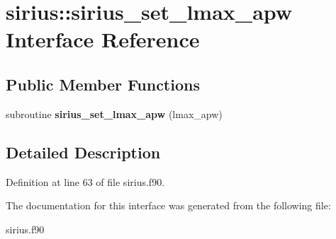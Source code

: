 \hypertarget{interfacesirius_1_1sirius__set__lmax__apw}{}\section{sirius\+:\+:sirius\+\_\+set\+\_\+lmax\+\_\+apw Interface Reference}
\label{interfacesirius_1_1sirius__set__lmax__apw}
\subsection*{Public Member Functions}
\begin{DoxyCompactItemize}
\item 
\hypertarget{interfacesirius_1_1sirius__set__lmax__apw_a0988ac9cd76d0462787851dafef0ecc0}{}subroutine {\bfseries sirius\+\_\+set\+\_\+lmax\+\_\+apw} (lmax\+\_\+apw)\label{interfacesirius_1_1sirius__set__lmax__apw_a0988ac9cd76d0462787851dafef0ecc0}

\end{DoxyCompactItemize}


\subsection{Detailed Description}


Definition at line 63 of file sirius.\+f90.



The documentation for this interface was generated from the following file\+:\begin{DoxyCompactItemize}
\item 
sirius.\+f90\end{DoxyCompactItemize}
